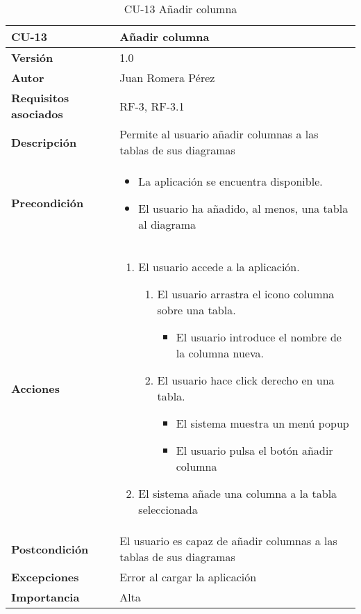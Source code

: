 \begin{table}[p]
    \centering
    \begin{tabularx}{\linewidth}{ p{} p{}}
		\toprule
		\textbf{CU-13}    & \textbf{Añadir columna}\\
		\toprule
		\textbf{Versión}              & 1.0    \\
		\textbf{Autor}                & Juan Romera Pérez \\
		\textbf{Requisitos asociados} & RF-3, RF-3.1 \\
		\textbf{Descripción}          & Permite al usuario añadir columnas a las tablas de sus diagramas \\
		\textbf{Precondición}         & \begin{itemize}
		    \item La aplicación se encuentra disponible.
            \item El usuario ha añadido, al menos, una tabla al diagrama
		\end{itemize} \\
		\textbf{Acciones}             &
		\begin{enumerate}
			\def\labelenumi{\arabic{enumi}.}
			\tightlist
			\item El usuario accede a la aplicación.
            \begin{enumerate}
                \item El usuario arrastra el icono columna sobre una tabla.
                \begin{itemize}
                    \item El usuario introduce el nombre de la columna nueva.
                \end{itemize}
                \item El usuario hace click derecho en una tabla.
                \begin{itemize}
                    \item El sistema muestra un menú popup
                    \item El usuario pulsa el botón añadir columna
                \end{itemize}
            \end{enumerate}
            \item El sistema añade una columna a la tabla seleccionada
		\end{enumerate}\\
		\textbf{Postcondición}        & El usuario es capaz de añadir columnas a las tablas de sus diagramas \\
		\textbf{Excepciones}          & Error al cargar la aplicación \\
		\textbf{Importancia}          & Alta \\
		\bottomrule
    \end{tabularx}
    \caption{CU-13 Añadir columna}
\end{table}


